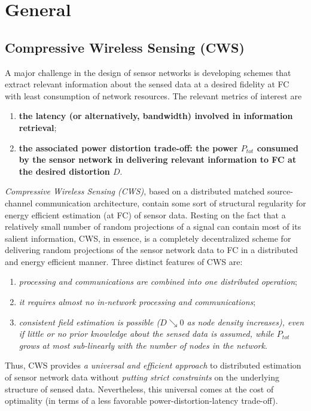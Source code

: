 \chapter{General}
\label{CWS}
\section{Compressive Wireless Sensing (CWS)}
A major challenge in the design of sensor networks is developing \textcolor[rgb]{0,0,1}{schemes that extract relevant information about the sensed data} at a desired fidelity at FC with \textcolor[rgb]{0,0,1}{least consumption of network resources}. The relevant metrics of interest are
\begin{enumerate}
    \item \textbf{\textcolor[rgb]{0,0,1}{the latency (or alternatively, bandwidth) involved in information retrieval}};
    \item \textbf{\textcolor[rgb]{0,0,1}{the associated power distortion trade-off: the power $P_{tot}$ consumed by the sensor network in delivering relevant information to FC at the desired distortion $D$}}.
\end{enumerate}

\emph{\textcolor[rgb]{0,0,1}{Compressive Wireless Sensing (CWS)}}, based on a distributed matched source-channel communication architecture, contain some sort of structural regularity for energy efficient estimation (at FC) of sensor data. Resting on the fact that a relatively small number of random projections of a signal can contain most of its salient information, CWS, in essence, is a completely decentralized scheme for delivering random projections of the sensor network data to FC in a distributed and energy efficient manner. Three distinct features of CWS are:
\begin{enumerate}
    \item \emph{\textcolor[rgb]{0,0,1}{processing and communications are combined into one distributed operation}};
    \item \emph{\textcolor[rgb]{0,0,1}{it requires almost no in-network processing and communications}};
    \item \emph{\textcolor[rgb]{0,0,1}{consistent field estimation is possible ($D\searrow0$ as node density increases), even if little or no prior knowledge about the sensed data is assumed, while $P_{tot}$ grows at most sub-linearly with the number of nodes in the network}}.
\end{enumerate}

Thus, CWS provides \emph{a universal and efficient approach} to distributed estimation of sensor network data without \emph{\textcolor[rgb]{0,0,1}{putting strict constraints}} on the underlying structure of sensed data. Nevertheless, this universal comes at the cost of optimality (in terms of a less favorable power-distortion-latency trade-off). 

